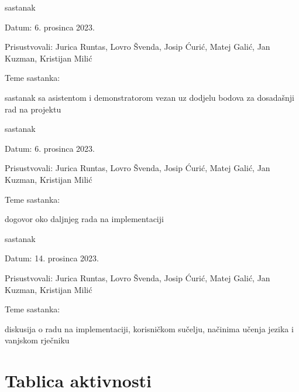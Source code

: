 \begin{packed_enum}
			\item sastanak
			\item[] \begin{packed_item}
			\item Datum: 6. prosinca 2023.
			\item Prisustvovali: Jurica Runtas, Lovro Švenda, Josip Ćurić,
			Matej Galić, Jan Kuzman, Kristijan Milić
			\item Teme sastanka:
			\begin{packed_item}
				\item sastanak sa asistentom i demonstratorom vezan uz dodjelu bodova za dosadašnji rad na projektu
			\end{packed_item}
			\end{packed_item}
		
			\item sastanak
			\item[] \begin{packed_item}
			\item Datum: 6. prosinca 2023.
			\item Prisustvovali: Jurica Runtas, Lovro Švenda, Josip Ćurić,
			Matej Galić, Jan Kuzman, Kristijan Milić
			\item Teme sastanka:
			\begin{packed_item}
				\item dogovor oko daljnjeg rada na implementaciji
			\end{packed_item}
			\end{packed_item}
		
			\item sastanak
			\item[] \begin{packed_item}
			\item Datum: 14. prosinca 2023.
			\item Prisustvovali: Jurica Runtas, Lovro Švenda, Josip Ćurić,
			Matej Galić, Jan Kuzman, Kristijan Milić
			\item Teme sastanka:
			\begin{packed_item}
				\item diskusija o radu na implementaciji, korisničkom sučelju, načinima učenja jezika i vanjskom rječniku
			\end{packed_item}
			\end{packed_item}
			
		\end{packed_enum}
		
		\eject
		\section*{Tablica aktivnosti}
		
